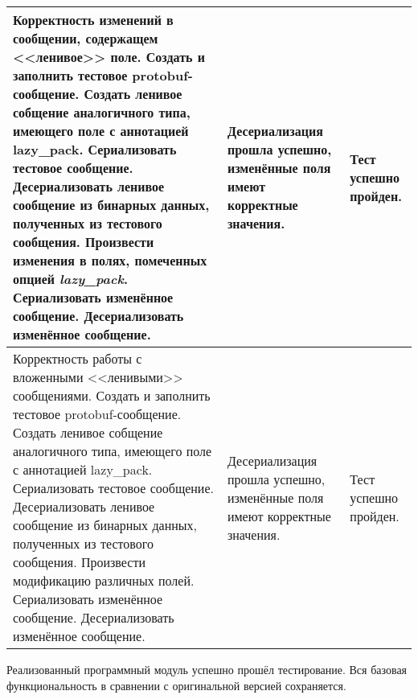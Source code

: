 \begin{longtable}{
    | >{\raggedright\arraybackslash}p{}
    | >{\raggedright\arraybackslash}p{}
    | >{\raggedright\arraybackslash}p{}|}
    Корректность изменений в сообщении, содержащем <<ленивое>> поле.
    \newline \newline
    Создать и заполнить тестовое protobuf-сообщение. \newline
    Создать ленивое собщение аналогичного типа, имеющего поле с аннотацией lazy\_pack. \newline
    Сериализовать тестовое сообщение. \newline
    Десериализовать ленивое сообщение из бинарных данных, полученных из тестового сообщения. \newline
    Произвести изменения в полях, помеченных опцией \textit{lazy\_pack}. \newline
    Сериализовать изменённое сообщение. \newline
    Десериализовать изменённое сообщение. &
    Десериализация прошла успешно, изменённые поля имеют корректные значения. &
    Тест успешно пройден. \\
    \hline

    Корректность работы с вложенными <<ленивыми>> сообщениями.
    \newline \newline
    Создать и заполнить тестовое protobuf-сообщение. \newline
    Создать ленивое собщение аналогичного типа, имеющего поле с аннотацией lazy\_pack. \newline
    Сериализовать тестовое сообщение. \newline
    Десериализовать ленивое сообщение из бинарных данных, полученных из тестового сообщения. \newline
    Произвести модификацию различных полей. \newline
    Сериализовать изменённое сообщение. \newline
    Десериализовать изменённое сообщение. &
    Десериализация прошла успешно, изменённые поля имеют корректные значения. &
    Тест успешно пройден. \\
    \hline

\end{longtable}

Реализованный программный модуль успешно прошёл тестирование. Вся базовая функциональность в сравнении с оригинальной версией сохраняется.

